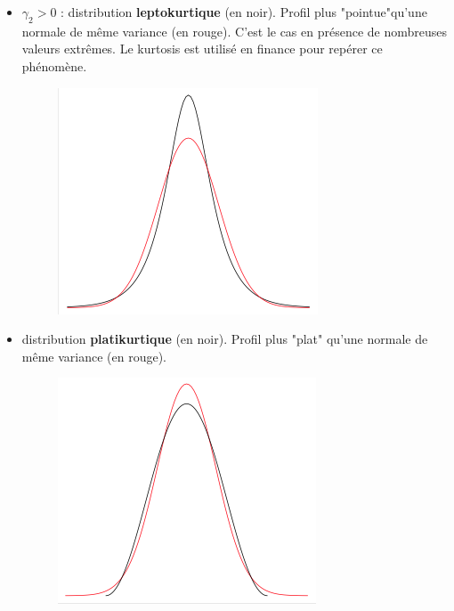 \begin{itemize}
\item $\gamma_{2}>0$ : distribution \textbf{leptokurtique} (en noir). Profil plus "pointue"qu'une normale de même
variance (en rouge). C'est le cas en présence de nombreuses valeurs extrêmes. Le kurtosis est utilisé en finance pour repérer ce phénomène.
\begin{figure}[H]\begin{center}\includegraphics[scale=0.7]{ilu/ccm7.png}\end{center}\end{figure}
\item distribution \textbf{platikurtique} (en noir). Profil plus "plat" qu'une normale de même variance (en rouge).
\begin{figure}[H]\begin{center}\includegraphics[scale=0.7]{ilu/ccm8.png}\end{center}\end{figure}
\end{itemize}
